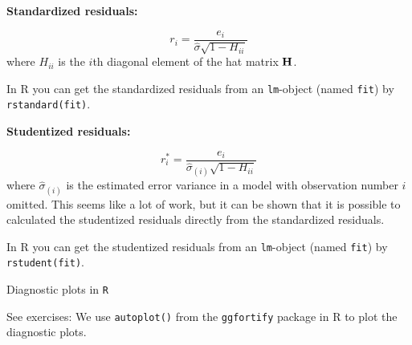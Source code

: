 \documentclass[10pt,ignorenonframetext,]{beamer}
\begin{document}
\begin{frame}[fragile]

\textbf{Standardized residuals:}

\[r_i=\frac{e_i}{\hat{\sigma}\sqrt{1-H_{ii}}}\] where \(H_{ii}\) is the
\(i\)th diagonal element of the hat matrix \({\bf H}\).

In R you can get the standardized residuals from an \texttt{lm}-object
(named \texttt{fit}) by \texttt{rstandard(fit)}.

\textbf{Studentized residuals:}

\[r^*_i=\frac{e_i}{\hat{\sigma}_{(i)}\sqrt{1-H_{ii}}}\] where
\(\hat{\sigma}_{(i)}\) is the estimated error variance in a model with
observation number \(i\) omitted. This seems like a lot of work, but it
can be shown that it is possible to calculated the studentized residuals
directly from the standardized residuals.

In R you can get the studentized residuals from an \texttt{lm}-object
(named \texttt{fit}) by \texttt{rstudent(fit)}.

\end{frame}

\begin{frame}[fragile]

\begin{block}{Diagnostic plots in \texttt{R}}

\vspace{2mm}

See exercises: We use \texttt{autoplot()} from the \texttt{ggfortify}
package in R to plot the diagnostic plots.

\end{block}

\end{frame}
\end{document}
